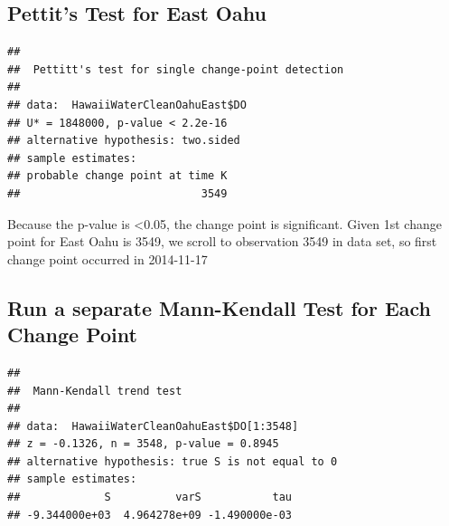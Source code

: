 \documentclass[12pt,]{article}
\newenvironment{Shaded}{\begin{snugshade}}{\end{snugshade}}
\newcommand{\KeywordTok}[1]{\textcolor[rgb]{0.13,0.29,0.53}{\textbf{#1}}}
\newcommand{\DecValTok}[1]{\textcolor[rgb]{0.00,0.00,0.81}{#1}}
\newcommand{\OperatorTok}[1]{\textcolor[rgb]{0.81,0.36,0.00}{\textbf{#1}}}
\newcommand{\NormalTok}[1]{#1}
\begin{document}
\subsection{Pettit's Test for East
Oahu}\label{pettits-test-for-east-oahu}

\begin{Shaded}
\end{Shaded}

\begin{verbatim}
## 
##  Pettitt's test for single change-point detection
## 
## data:  HawaiiWaterCleanOahuEast$DO
## U* = 1848000, p-value < 2.2e-16
## alternative hypothesis: two.sided
## sample estimates:
## probable change point at time K 
##                            3549
\end{verbatim}

Because the p-value is \textless{}0.05, the change point is significant.
Given 1st change point for East Oahu is 3549, we scroll to observation
3549 in data set, so first change point occurred in 2014-11-17

\subsection{Run a separate Mann-Kendall Test for Each Change
Point}\label{run-a-separate-mann-kendall-test-for-each-change-point-3}

\begin{Shaded}
\end{Shaded}

\begin{verbatim}
## 
##  Mann-Kendall trend test
## 
## data:  HawaiiWaterCleanOahuEast$DO[1:3548]
## z = -0.1326, n = 3548, p-value = 0.8945
## alternative hypothesis: true S is not equal to 0
## sample estimates:
##             S          varS           tau 
## -9.344000e+03  4.964278e+09 -1.490000e-03
\end{verbatim}

\begin{Shaded}
\end{Shaded}
\end{document}
